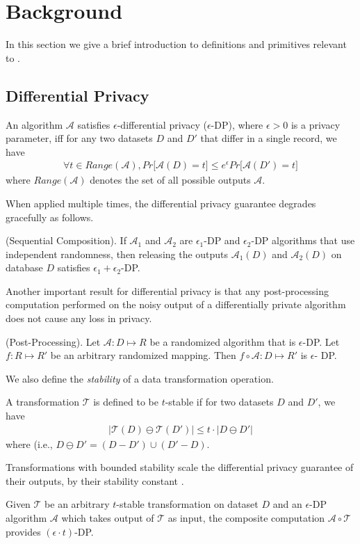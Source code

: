 
\section{Background}
In this section we give a brief introduction to definitions and primitives relevant to \system. 

\subsection{Differential Privacy}
\begin{definition} An algorithm $\mathcal{A}$
satisfies $\epsilon$-differential privacy ($\epsilon$-DP), where $\epsilon > 0$ is a privacy parameter, iff
 for any two datasets $D$ and $D'$ that differ in a single record, we have
\begin{gather}
\forall t \in Range(\mathcal{A}), Pr \big[\mathcal{A}(D) = t\big] \leq e^{\epsilon}Pr\big[\mathcal{A}(D') = t\big]
\end{gather}
where $Range(\mathcal{A})$ denotes the set of all possible outputs
$\mathcal{A}$.
\end{definition} 
When applied multiple times, the differential privacy guarantee degrades gracefully as follows.
\begin{theorem}(Sequential Composition). If $\mathcal{A}_1$ and
$\mathcal{A}_2$ are $\epsilon_1$-DP and $\epsilon_2$-DP algorithms that use independent randomness, then releasing the outputs $\mathcal{A}_1(D)$ and
$\mathcal{A}_2(D)$ on database $D$ satisfies $\epsilon_1+\epsilon_2$-DP.\end{theorem} 
Another important result for differential privacy is that any post-processing computation performed on the noisy output of a differentially private algorithm does not cause any loss in privacy.
\begin{theorem}(Post-Processing). Let $\mathcal{A}: D \mapsto R$ be a randomized
algorithm that is $\epsilon$-DP. Let $f : R \mapsto R'$ be an
arbitrary randomized mapping. Then $f \circ \mathcal{A} : D \mapsto R'$ is $\epsilon$-
DP. \label{post}\end{theorem}
We also define the \emph{stability} of a data transformation operation.
\begin{definition}A transformation $\mathcal{T}$ is defined to be $t$-stable if for two datasets $D$ and $D'$, we have\begin{gather}|\mathcal{T}(D)\ominus \mathcal{T}(D')| \leq t \cdot |D\ominus D'|  \end{gather} where  (i.e.,  $D \ominus D' = (D-D') \cup (D'-D)$. \end{definition}
Transformations with bounded stability scale the differential privacy guarantee of their outputs, by their stability constant \cite{PINQ}.
\begin{theorem}
Given $\mathcal{T}$ be an arbitrary $t$-stable transformation on dataset $D$ and an $\epsilon$-DP algorithm $\mathcal{A}$ which takes output of $\mathcal{T}$ as input, the composite computation $\mathcal{A} \circ \mathcal{T}$ provides $(\epsilon \cdot t)$-DP.\end{theorem}

